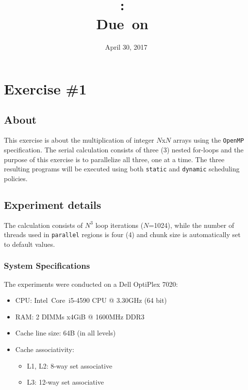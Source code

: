 \documentclass{article}
\title{
\vspace{2in}
\textmd{\textbf{\hmwkClass:\ \hmwkTitle}}\\
\normalsize\vspace{0.1in}\small{Due\ on\ \hmwkDueDate}\\
\vspace{0.1in}\large{\textit{\hmwkClassInstructor}}
\vspace{3in}
}
\author{\textbf{\hmwkAuthorName}}
\date{April 30, 2017} %
\def\code#1{\texttt{#1}}
\begin{document}
\maketitle


\newpage
\tableofcontents
\newpage



\section{Exercise \#1}

\subsection{About}
This exercise is about the multiplication of integer $N$x$N$ arrays using the \texttt{OpenMP}
specification. The serial calculation consists of three (3) nested for-loops and the purpose of
this exercise is to parallelize all three, one at a time. The three resulting programs will be
executed using both \code{static} and \code{dynamic} scheduling policies.

\subsection{Experiment details}
The calculation consists of $N^3$ loop iterations ($N$=1024), while the number of threads
used in \code{parallel} regions is four (4) and chunk size is automatically set to default
values.

\subsubsection{System Specifications}
The experiments were conducted on a Dell OptiPlex 7020:
\begin{itemize}
 \item CPU: Intel\textregistered \ Core\texttrademark \ i5-4590 CPU @ 3.30GHz (64 bit)
 \item RAM: 2 DIMMs x4GiB @ 1600MHz DDR3
 \item Cache line size: 64B (in all levels)
 \item Cache associativity:
 \begin{itemize}
  \item L1, L2: 8-way set associative
  \item L3: 12-way set associative
 \end{itemize}
\end{itemize}
\end{document}
